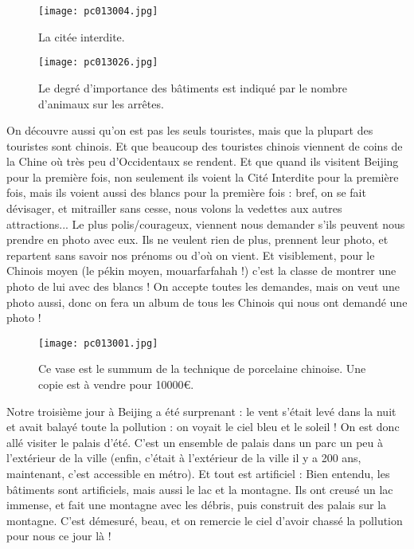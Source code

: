 \documentclass{book}
\begin{document}
\begin{figure}[h]
\centering
\texttt{[image: pc013004.jpg]}
\caption*{ La citée interdite.}
\end{figure}


\begin{figure}[h]
\centering
\texttt{[image: pc013026.jpg]}
\caption*{ Le degré d'importance des bâtiments est indiqué par le nombre d'animaux sur les arrêtes.}
\end{figure}

On découvre aussi qu'on est pas les seuls touristes, mais que la plupart des touristes sont chinois. Et que beaucoup des touristes chinois viennent de coins de la Chine où très peu d'Occidentaux se rendent. Et que quand ils visitent Beijing pour la première fois, non seulement ils voient la Cité Interdite pour la première fois, mais ils voient aussi des blancs pour la première fois : bref, on se fait dévisager, et mitrailler sans cesse, nous volons la vedettes aux autres attractions... Le plus polis/courageux, viennent nous demander s'ils peuvent nous prendre en photo avec eux. Ils ne veulent rien de plus, prennent leur photo, et repartent sans savoir nos prénoms ou d'où on vient. Et visiblement, pour le Chinois moyen (le pékin moyen, mouarfarfahah !) c'est la classe de montrer une photo de lui avec des blancs ! On accepte toutes les demandes, mais on veut une photo aussi, donc on fera un album de tous les Chinois qui nous ont demandé une photo !


\begin{figure}[h]
\centering
\texttt{[image: pc013001.jpg]}
\caption*{ Ce vase est le summum de la technique de porcelaine chinoise. Une copie est à vendre pour 10000\euro.}
\end{figure}

Notre troisième jour à Beijing a été surprenant : le vent s'était levé dans la nuit et avait balayé toute la pollution : on voyait le ciel bleu et le soleil ! On est donc allé visiter le palais d'été. C'est un ensemble de palais dans un parc un peu à l'extérieur de la ville (enfin, c'était à l'extérieur de la ville il y a 200 ans, maintenant, c'est accessible en métro). Et tout est artificiel : Bien entendu, les bâtiments sont artificiels, mais aussi le lac et la montagne. Ils ont creusé un lac immense, et fait une montagne avec les débris, puis construit des palais sur la montagne. C'est démesuré, beau, et on remercie le ciel d'avoir chassé la pollution pour nous ce jour là !
\end{document}
